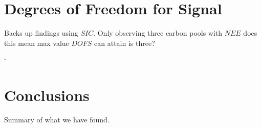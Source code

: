 \documentclass[11pt]{article}
\begin{document}
\section*{Degrees of Freedom for Signal}
Backs up findings using $SIC$. Only observing three carbon pools with $NEE$ does this mean max value $DOFS$ can attain is three?

`\section*{Conclusions}
Summary of what we have found.


{}

\end{document}
